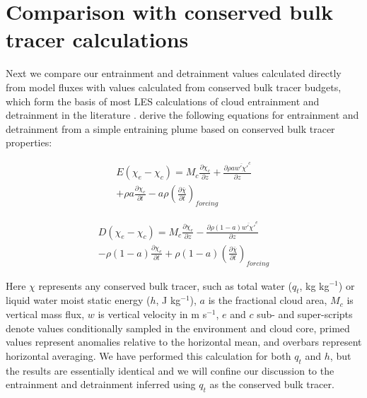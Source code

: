 \documentclass[12pt]{article}
\begin{document}

\section{Comparison with conserved bulk tracer calculations}

Next we compare our entrainment and detrainment values calculated directly from 
model fluxes with values calculated from conserved bulk tracer budgets, which 
form the basis of most LES calculations of cloud entrainment and detrainment in 
the literature \citep{Siebesma2003, Rooy2008}.  \cite{Siebesma1995} derive the 
following equations for entrainment and detrainment from a simple entraining 
plume based on conserved bulk tracer properties:

\begin{equation}
  \label{eq:entrainment}
  \begin{split}
    E (\chi_e - \chi_c) 
    = M_c \frac{\partial \chi_c}{\partial z}
    + \frac{\partial \rho a \overline{w' \chi'}^c}{\partial z} \\
    + \rho a \frac{\partial \chi_c}{\partial t}
    - a \rho \left(\frac{\partial \bar{\chi}}{\partial t}\right)_{forcing}
  \end{split}
\end{equation}

\begin{equation}
  \label{eq:detrainment}
  \begin{split}
    D (\chi_e - \chi_c)
    = M_c \frac{\partial \chi_e}{\partial z}
    - \frac{\partial \rho (1 - a) \overline{w' \chi'}^e}{\partial z} \\
    - \rho (1 - a) \frac{\partial \chi_e}{\partial t}
    + \rho (1 - a) \left(\frac{\partial \bar{\chi}}{\partial t}\right)_{forcing}
  \end{split}
\end{equation}

Here $\chi$ represents any conserved bulk tracer, such as total water ($q_t$, 
kg kg$^{-1}$) or liquid water moist static energy ($h$, J kg$^{-1}$), $a$ is 
the fractional cloud area, $M_c$ is vertical mass flux, $w$ is vertical 
velocity in m s$^{-1}$, $e$ and $c$ sub- and super-scripts denote values 
conditionally sampled in the environment and cloud core, primed values represent 
anomalies relative to the horizontal mean, and overbars represent horizontal 
averaging.  We have performed this calculation for both $q_t$ and $h$, but the 
results are essentially identical and we will confine our discussion to the 
entrainment and detrainment inferred using $q_t$ as the conserved bulk tracer.  
\end{document}
